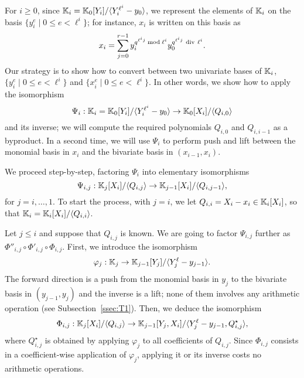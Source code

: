 \documentclass{sig-alternate}
\begin{document}
For $i \ge 0$, since $\mathbb{K}_i=\mathbb{K}_0[Y_i]/\langle Y_i^{\ell^i}-y_0\rangle$,
we represent the elements of $\mathbb{K}_i$ on the basis $\{y_i^e \mid 0 \le e
< \ell^i\}$; for instance, $x_i$ is written on this basis as
\begin{equation}\label{eq-def:xiyi}
x_i = \sum_{j = 0}^{r-1} y_i^{q^{\ell^i j} \bmod \ell^i}
y_0^{q^{\ell^i j} {\rm~div~} \ell^i}. 
\end{equation}
Our strategy is to show how to convert between two univariate bases of
$\mathbb{K}_i$, $\{y_i^e \mid 0 \le e < \ell^i\}$ and $\{x_i^e \mid 0 \le e <
\ell^i\}$. In other words, we show how to apply the isomorphism
$$\Psi_i: \mathbb{K}_i=\mathbb{K}_0[Y_i]/\langle Y_i^{\ell^i}-y_0\rangle \to
\mathbb{K}_0[X_i]/\langle Q_{i,0}\rangle$$ and its inverse; we will compute
the required polynomials $Q_{i,0}$ and $Q_{i,i-1}$ as a byproduct. In
a second time, we will use $\Psi_i$ to perform push and lift between
the monomial basis in $x_i$ and the bivariate basis in
$(x_{i-1},x_i)$.

We proceed step-by-step, factoring $\Psi_i$ into elementary
isomorphisms
$$\Psi_{i,j}: \mathbb{K}_j[X_i]/\langle Q_{i,j}\rangle \to
\mathbb{K}_{j-1}[X_i]/\langle Q_{i,j-1}\rangle,$$ for $j=i,\dots,1$.  To start
the process, with $j=i$, we let $Q_{i,i}=X_i-x_i \in \mathbb{K}_i[X_i]$,
so that $\mathbb{K}_i=\mathbb{K}_i[X_i]/\langle Q_{i,i} \rangle$.

Let $j \le i$ and suppose that $Q_{i,j}$ is known. We are going to
factor $\Psi_{i,j}$ further as $\Phi''_{i,j} \circ \Phi'_{i,j} \circ
\Phi_{i,j}$. First, we introduce the isomorphism
$$\varphi_j: \mathbb{K}_j \to \mathbb{K}_{j-1}[Y_j]/\langle Y_j^\ell-y_{j-1}\rangle.$$
The forward direction is a push from the monomial basis in $y_j$ to
the bivariate basis in $(y_{j-1},y_j)$ and the inverse is a lift; none
of them involves any arithmetic operation (see
Subsection~\ref{ssec:T1}).  Then, we deduce the isomorphism
$$\Phi_{i,j}: \mathbb{K}_j[X_i]/\langle Q_{i,j} \rangle \to
\mathbb{K}_{j-1}[Y_j,X_i]/\langle Y_j^\ell-y_{j-1}, Q^\star_{i,j}\rangle,$$
where $Q^\star_{i,j}$ is obtained by applying $\varphi_j$ to all
coefficients of $Q_{i,j}$. Since $\Phi_{i,j}$ consists in a
coefficient-wise application of $\varphi_j$, applying it or its
inverse costs no arithmetic operations.
\end{document}
